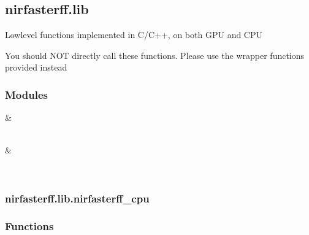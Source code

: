 \documentclass[letterpaper,10pt,english]{sphinxmanual}
\begin{document}
\sphinxstepscope


\subsection{nirfasterff.lib}
\label{\detokenize{_autosummary/nirfasterff.lib:module-nirfasterff.lib}}\label{\detokenize{_autosummary/nirfasterff.lib:nirfasterff-lib}}\label{\detokenize{_autosummary/nirfasterff.lib::doc}}
\sphinxAtStartPar
Low\sphinxhyphen{}level functions implemented in C/C++, on both GPU and CPU

\sphinxAtStartPar
You should NOT directly call these functions. Please use the wrapper functions provided instead
\subsubsection*{Modules}


\begin{savenotes}\sphinxattablestart
\sphinxthistablewithglobalstyle
\sphinxthistablewithnovlinesstyle
\centering
\begin{tabulary}{\linewidth}[t]{}
\sphinxtoprule
\sphinxtableatstartofbodyhook
\sphinxAtStartPar
{\hyperref[\detokenize{_autosummary/nirfasterff.lib.nirfasterff_cpu:module-nirfasterff.lib.nirfasterff_cpu}]{}}
&
\sphinxAtStartPar

\\
\sphinxhline
\sphinxAtStartPar
{\hyperref[\detokenize{_autosummary/nirfasterff.lib.nirfasterff_cuda:module-nirfasterff.lib.nirfasterff_cuda}]{}}
&
\sphinxAtStartPar

\\
\sphinxbottomrule
\end{tabulary}
\sphinxtableafterendhook\par
\sphinxattableend\end{savenotes}

\sphinxstepscope


\subsubsection{nirfasterff.lib.nirfasterff\_cpu}
\label{\detokenize{_autosummary/nirfasterff.lib.nirfasterff_cpu:module-nirfasterff.lib.nirfasterff_cpu}}\label{\detokenize{_autosummary/nirfasterff.lib.nirfasterff_cpu:nirfasterff-lib-nirfasterff-cpu}}\label{\detokenize{_autosummary/nirfasterff.lib.nirfasterff_cpu::doc}}\subsubsection*{Functions}
\end{document}
